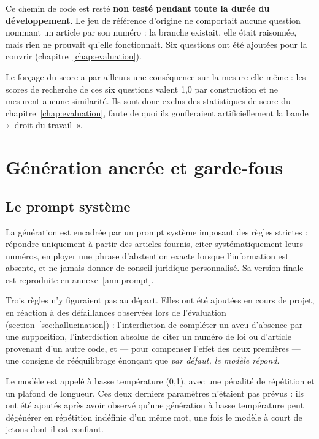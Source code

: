 \begin{limite}
Ce chemin de code est resté \textbf{non testé pendant toute la durée du développement}. Le jeu de
référence d'origine ne comportait aucune question nommant un article par son numéro : la branche
existait, elle était raisonnée, mais rien ne prouvait qu'elle fonctionnait. Six questions ont été
ajoutées pour la couvrir (chapitre~\ref{chap:evaluation}).

\smallskip
Le forçage du score a par ailleurs une conséquence sur la mesure elle-même : les scores de
recherche de ces six questions valent 1,0 par construction et ne mesurent aucune similarité. Ils
sont donc exclus des statistiques de score du chapitre~\ref{chap:evaluation}, faute de quoi ils
gonfleraient artificiellement la bande «~droit du travail~».
\end{limite}

\section{Génération ancrée et garde-fous}

\subsection{Le prompt système}

La génération est encadrée par un prompt système imposant des règles strictes : répondre
uniquement à partir des articles fournis, citer systématiquement leurs numéros, employer une
phrase d'abstention exacte lorsque l'information est absente, et ne jamais donner de conseil
juridique personnalisé. Sa version finale est reproduite en annexe~\ref{ann:prompt}.

Trois règles n'y figuraient pas au départ. Elles ont été ajoutées en cours de projet, en réaction
à des défaillances observées lors de l'évaluation (section~\ref{sec:hallucination}) :
l'interdiction de compléter un aveu d'absence par une supposition, l'interdiction absolue de citer
un numéro de loi ou d'article provenant d'un autre code, et --- pour compenser l'effet des deux
premières --- une consigne de rééquilibrage énonçant que \emph{par défaut, le modèle répond}.

Le modèle est appelé à basse température (0,1), avec une pénalité de répétition et un plafond de
longueur. Ces deux derniers paramètres n'étaient pas prévus : ils ont été ajoutés après avoir
observé qu'une génération à basse température peut dégénérer en répétition indéfinie d'un même
mot, une fois le modèle à court de jetons dont il est confiant.

